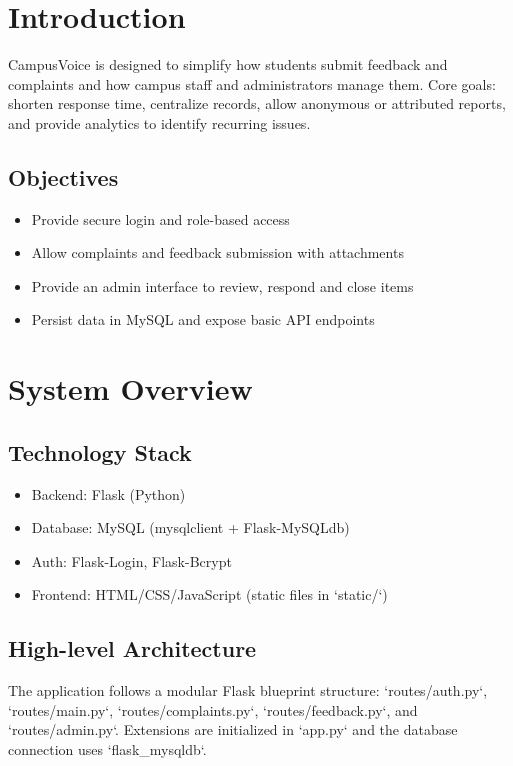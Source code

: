 \documentclass[12pt]{report}
\begin{document}
\clearpage
\tableofcontents
\clearpage

\chapter{Introduction}
CampusVoice is designed to simplify how students submit feedback and complaints and how campus staff and administrators manage them. Core goals: shorten response time, centralize records, allow anonymous or attributed reports, and provide analytics to identify recurring issues.

\section{Objectives}
\begin{itemize}
  \item Provide secure login and role-based access
  \item Allow complaints and feedback submission with attachments
  \item Provide an admin interface to review, respond and close items
  \item Persist data in MySQL and expose basic API endpoints
\end{itemize}

\chapter{System Overview}
\section{Technology Stack}
\begin{itemize}
  \item Backend: Flask (Python)
  \item Database: MySQL (mysqlclient + Flask-MySQLdb)
  \item Auth: Flask-Login, Flask-Bcrypt
  \item Frontend: HTML/CSS/JavaScript (static files in `static/`)
\end{itemize}

\section{High-level Architecture}
The application follows a modular Flask blueprint structure: `routes/auth.py`, `routes/main.py`, `routes/complaints.py`, `routes/feedback.py`, and `routes/admin.py`. Extensions are initialized in `app.py` and the database connection uses `flask_mysqldb`.
\end{document}
